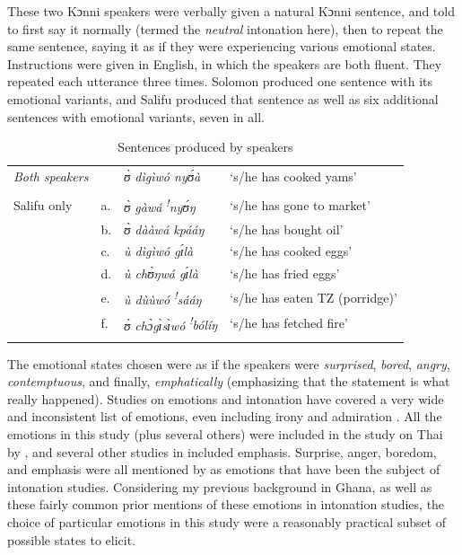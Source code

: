 \documentclass[output=paper]{langsci/langscibook}
\begin{document}
These two Kɔnni speakers were verbally given a natural Kɔnni sentence, and told to first say it normally (termed the \emph{neutral} intonation here), then to repeat the same sentence, saying it as if they were experiencing various emotional states. Instructions were given in English, in which the speakers are both fluent. They repeated each utterance three times. Solomon produced one sentence with its emotional variants, and Salifu produced that sentence as well as six additional sentences with emotional variants, seven in all.


\begin{table}
\begin{tabular}{llll}
\lsptoprule

\emph{\textup{Both speakers}} & & \textit{ʊ̀ dìgìwó nyʊ́à} & `s/he has cooked yams'\\ & & & \\
Salifu only & a. & \textit{ʊ̀ gàwá} \textit{\textsuperscript{!}}\textit{nyʊ́ŋ} & `s/he has gone to market'\\
& b. & \textit{ʊ̀ dààwá kpááŋ} & `s/he has bought oil'\\
& c. & \textit{ù dìgìwó gɪ́là} & `s/he has cooked eggs'\\
& d. & \textit{ù chʊ̀ŋwá gɪ́là} & `s/he has fried eggs'\\
& e. & \textit{ù dùùwó} \textit{\textsuperscript{!}}\textit{sááŋ} & `s/he has eaten TZ (porridge)'\\
& f. & \textit{ʊ̀ chɔ̀gɪ̀sɪ̀wó} \textit{\textsuperscript{!}}\textit{bólíŋ} & `s/he has fetched fire'  \\
\lspbottomrule
\end{tabular}

\caption{Sentences produced by speakers}
\label{tab:2.cahill}

\end{table}

The emotional states chosen were as if the speakers were \emph{surprised}, \emph{bored}, \emph{angry}, \emph{contemptuous}, and finally, \emph{emphatically} (emphasizing that the statement is what really happened). Studies on emotions and intonation have covered a very wide and inconsistent list of emotions, even including irony and admiration \citep[402]{doetal1998}. All the emotions in this study (plus several others) were included in the study on Thai by \citet{luksaneeyanawin1998}, and several other studies in \citet{hirstdicristo1998} included emphasis. Surprise, anger, boredom, and emphasis were all mentioned by \citet{ladd2008} as emotions that have been the subject of intonation studies. Considering my previous background in Ghana, as well as these fairly common prior mentions of these emotions in intonation studies, the choice of particular emotions in this study were a reasonably practical subset of possible states to elicit.
\end{document}
